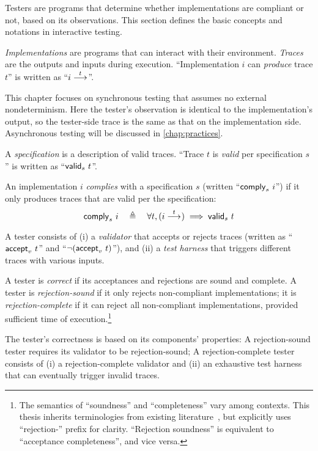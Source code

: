 Testers are programs that determine whether implementations are compliant or
not, based on its observations.  This section defines the basic concepts and
notations in interactive testing.

\begin{definition}
  {\em Implementations} are programs that can interact with their environment.
  {\em Traces} are the outputs and inputs during execution.  ``Implementation
  $i$ can {\em produce} trace $t$'' is written as ``$i\overset{t}\longrightarrow_{}$''.
\end{definition}

This chapter focuses on synchronous testing that assumes no external
nondeterminism.  Here the tester's observation is identical to the
implementation's output, so the tester-side trace is the same as that on the
implementation side.  Asynchronous testing will be discussed in
\autoref{chap:practices}.

\begin{definition}
  \label{def:compliance}
  A {\em specification} is a description of valid traces.  ``Trace $t$ is {\em
    valid} per specification $s$'' is written as ``$\mathsf{valid}_{s}~{t}$''.

  An implementation $i$ {\em complies} with a specification $s$ (written
  ``$\mathsf{comply}_{s}~{i}$'') if it only produces traces that are valid per the
  specification:
  \[\mathsf{comply}_{s}~{i}\quad\triangleq\quad\forall t,(i\overset{t}\longrightarrow_{})\implies\mathsf{valid}_{s}~{t}\]
\end{definition}

\begin{definition}
  \label{def:tester}
  A tester consists of (i) a {\em validator} that accepts or rejects
  traces (written as ``$\mathsf{accept}_{v}~{t}$'' and ``$\neg(\mathsf{accept}_{v}~{t})$''), and
  (ii) a {\em test harness} that triggers different traces with
  various inputs.

  A tester is {\em correct} if its acceptances and rejections are sound and
  complete.  A tester is {\em rejection-sound} if it only rejects non-compliant
  implementations; it is {\em rejection-complete} if it can reject all
  non-compliant implementations, provided sufficient time of
  execution.\footnote{The semantics of ``soundness'' and ``completeness'' vary
    among contexts.  This thesis inherits terminologies from existing
    literature~\cite{Tretmans}, but explicitly uses ``rejection-'' prefix for
    clarity.  ``Rejection soundness'' is equivalent to ``acceptance
    completeness'', and vice versa.}

  The tester's correctness is based on its components' properties: A
  rejection-sound tester requires its validator to be rejection-sound; A
  rejection-complete tester consists of (i) a rejection-complete validator
  and (ii) an exhaustive test harness that can eventually trigger invalid
  traces.
\end{definition}

